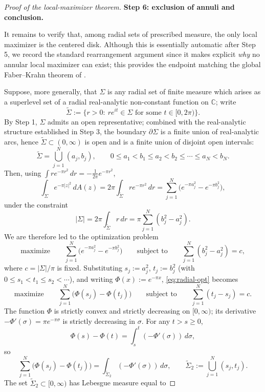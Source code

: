 \documentclass[a4paper,11pt,reqno]{amsart}
\numberwithin{equation}{section}
\theoremstyle{plain} %
\theoremstyle{definition} %
\theoremstyle{remark}
\newcommand{\C}{\mathbb{C}}
\begin{document}
\begin{proof}[Proof of the local-maximizer theorem]
\medskip
\noindent
{\bf Step 6: exclusion of annuli and conclusion.}

It remains to verify that, among radial sets of prescribed measure, the only
local maximizer is the centered disk. Although this is essentially automatic
after Step 5, we record the standard rearrangement argument since it makes
explicit \emph{why} no annular local maximizer can exist; this provides the
endpoint matching the global Faber--Krahn theorem of \cite{Nicola-Tilli}.

Suppose, more generally, that \(\Sigma\) is any radial set of finite measure
which arises as a superlevel set of a radial real-analytic non-constant
function on \(\C\); write
\[
\widetilde \Sigma:=\{r>0:\ re^{it}\in \Sigma \text{ for some } t\in [0,2\pi)\}.
\]
By Step 1, \(\Sigma\) admits an open representative; combined with the
real-analytic structure established in Step 3, the boundary
\(\partial\Sigma\) is a finite union of real-analytic arcs, hence
\(\widetilde \Sigma\subset (0,\infty)\) is open and is a finite union of
disjoint open intervals:
\[
\widetilde \Sigma=\bigcup_{j=1}^N (a_j,b_j),
\qquad
0\le a_1<b_1\le a_2<b_2\le \cdots\le a_N<b_N.
\]
Then, using \(\int re^{-\pi r^2}\,dr=-\frac{1}{2\pi}e^{-\pi r^2}\),
\[
\int_\Sigma e^{-\pi |z|^2}\,dA(z)
=
2\pi \int_{\widetilde \Sigma} r e^{-\pi r^2}\,dr
=
\sum_{j=1}^N \big(e^{-\pi a_j^2}-e^{-\pi b_j^2}\big),
\]
under the constraint
\[
|\Sigma|
=
2\pi \int_{\widetilde \Sigma} r\,dr
=
\pi \sum_{j=1}^N (b_j^2-a_j^2).
\]
We are therefore led to the optimization problem
\begin{equation}\label{eq:radial-opt}
\text{maximize}\qquad
\sum_{j=1}^N \big(e^{-\pi a_j^2}-e^{-\pi b_j^2}\big)
\qquad \text{subject to}\qquad
\sum_{j=1}^N (b_j^2-a_j^2)=c,
\end{equation}
where \(c=|\Sigma|/\pi\) is fixed. Substituting \(s_j:=a_j^2\),
\(t_j:=b_j^2\) (with \(0\le s_1<t_1\le s_2<\cdots\)), and writing
\(\Phi(x):=e^{-\pi x}\), \eqref{eq:radial-opt} becomes
\[
\text{maximize}\qquad
\sum_{j=1}^N \big(\Phi(s_j)-\Phi(t_j)\big)
\qquad \text{subject to}\qquad
\sum_{j=1}^N (t_j-s_j)=c.
\]
The function \(\Phi\) is strictly convex and strictly decreasing on
\([0,\infty)\); its derivative \(-\Phi'(\sigma)=\pi e^{-\pi\sigma}\) is strictly
decreasing in \(\sigma\). For any \(t>s\ge 0\),
\[
\Phi(s)-\Phi(t)
=
\int_s^t (-\Phi'(\sigma))\,d\sigma,
\]
so
\[
\sum_{j=1}^N\big(\Phi(s_j)-\Phi(t_j)\big)
=
\int_{\widetilde\Sigma_2}(-\Phi'(\sigma))\,d\sigma,
\qquad
\widetilde\Sigma_2:=\bigcup_{j=1}^N (s_j,t_j).
\]
The set \(\widetilde\Sigma_2\subset[0,\infty)\) has Lebesgue measure equal to

\end{proof}
\end{document}
